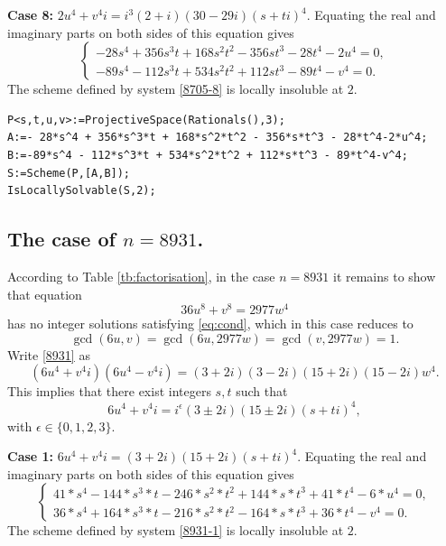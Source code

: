 \documentclass[a4paper,12pt,english,reqno]{amsart}
\begin{document}
{\bf Case 8:} $2u^4+v^4i=i^3(2+i)(30-29i)(s+ti)^4$. Equating the real and imaginary parts on both sides of this equation gives
\begin{equation}\label{8705-8}
\begin{cases}
-28s^4 + 356s^3t + 168s^2t^2 - 356st^3 - 28t^4 - 2u^4=0,\\
-89s^4 - 112s^3t + 534s^2t^2 + 112st^3 - 89t^4 - v^4=0.
\end{cases}
\end{equation}
The scheme defined by system \eqref{8705-8} is locally insoluble at $2$.

\begin{lstlisting}
P<s,t,u,v>:=ProjectiveSpace(Rationals(),3);
A:=- 28*s^4 + 356*s^3*t + 168*s^2*t^2 - 356*s*t^3 - 28*t^4-2*u^4;
B:=-89*s^4 - 112*s^3*t + 534*s^2*t^2 + 112*s*t^3 - 89*t^4-v^4;
S:=Scheme(P,[A,B]);
IsLocallySolvable(S,2);
\end{lstlisting}


\subsection{The case of $n=8931$.}%
 According to Table \ref{tb:factorisation}, in the case $n=8931$ it remains to
show that equation
\begin{equation}\label{8931}
36u^8+v^8=2977 w^4
\end{equation}
has no integer solutions satisfying \eqref{eq:cond}, which in this case reduces to  \[\gcd(6u,v)=\gcd(6u,2977w)=\gcd(v,2977w)=1.\]
Write \eqref{8931} as 
\begin{equation} (6u^4+v^4i)(6u^4-v^4i)=(3+2i)(3-2i)(15+2i)(15-2i)w^4.
\end{equation}
This implies that there exist integers $s,t$ such that 
\[6u^4+v^4i=i^{\epsilon}(3\pm 2i)(15\pm 2i)(s+ti)^4,\]
with $\epsilon \in \{0,1,2,3\}$.


{\bf Case 1:} $6u^4+v^4i=(3+2i)(15+2i)(s+ti)^4$. Equating the real and imaginary parts on both sides of this equation gives
\begin{equation}\label{8931-1}
\begin{cases}
41*s^4 - 144*s^3*t - 246*s^2*t^2 + 144*s*t^3 + 41*t^4 - 6*u^4=0,\\
36*s^4 + 164*s^3*t - 216*s^2*t^2 - 164*s*t^3 + 36*t^4 - v^4=0.
\end{cases}
\end{equation}
The scheme defined by system \eqref{8931-1} is locally insoluble at $2$.
\end{document}
